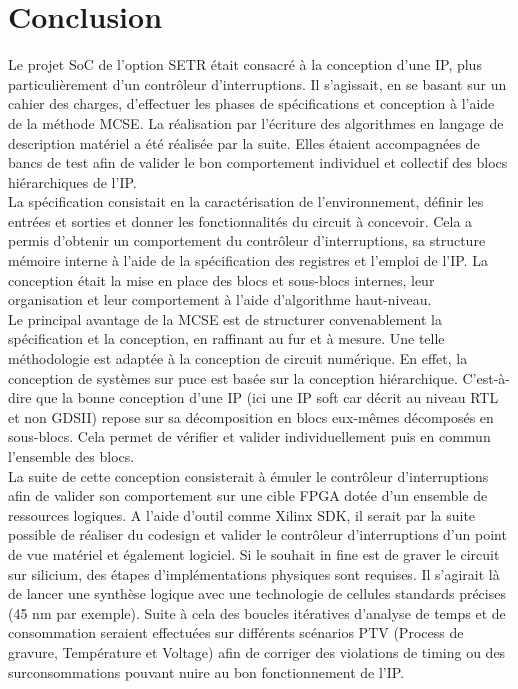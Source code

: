 \section{Conclusion}


Le projet SoC de l'option SETR était consacré à la conception d'une IP, plus particulièrement d'un contrôleur d'interruptions.
Il s'agissait, en se basant sur un cahier des charges, d'effectuer les phases de spécifications et conception à l'aide de la méthode MCSE.
La réalisation par l'écriture des algorithmes en langage de description matériel a été réalisée par la suite.
Elles étaient accompagnées de bancs de test afin de valider le bon comportement individuel et collectif des blocs hiérarchiques de l'IP.\\

La spécification consistait en la caractérisation de l'environnement, définir les entrées et sorties et donner les fonctionnalités du circuit à concevoir.
Cela a permis d'obtenir un comportement du contrôleur d'interruptions, sa structure mémoire interne à l'aide de la spécification des registres et l'emploi de l'IP.
La conception était la mise en place des blocs et sous-blocs internes, leur organisation et leur comportement à l'aide d'algorithme haut-niveau.\\

Le principal avantage de la MCSE est de structurer convenablement la spécification et la conception, en raffinant au fur et à mesure.
Une telle méthodologie est adaptée à la conception de circuit numérique.
En effet, la conception de systèmes sur puce est basée sur la conception hiérarchique.
C'est-à-dire que la bonne conception d'une IP (ici une IP soft car décrit au niveau RTL et non GDSII) repose sur sa décomposition en blocs eux-mêmes décomposés en sous-blocs.
Cela permet de vérifier et valider individuellement puis en commun l'ensemble des blocs.\\

La suite de cette conception consisterait à émuler le contrôleur d'interruptions afin de valider son comportement sur une cible FPGA dotée d'un ensemble de ressources logiques.
A l'aide d'outil comme Xilinx SDK, il serait par la suite possible de réaliser du codesign et valider le contrôleur d'interruptions d'un point de vue matériel et également logiciel.
Si le souhait in fine est de graver le circuit sur silicium, des étapes d'implémentations physiques sont requises.
Il s'agirait là de lancer une synthèse logique avec une technologie de cellules standards précises (45 nm par exemple).
Suite à cela des boucles itératives d'analyse de temps et de consommation seraient effectuées sur différents scénarios PTV (Process de gravure, Température et Voltage) afin de corriger des violations de timing ou des surconsommations pouvant nuire au bon fonctionnement de l'IP.



